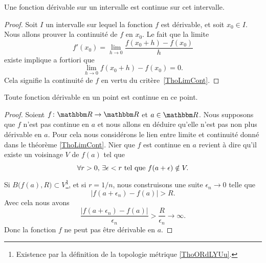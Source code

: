 \begin{proposition} \label{PropSFyxOWF}
    Une fonction dérivable sur un intervalle est continue sur cet intervalle.
\end{proposition}

\begin{proof}
    Soit \( I\) un intervalle sur lequel la fonction \( f\) est dérivable, et soit \( x_0\in I\). Nous allons prouver la continuité de \( f\) en \( x_0\). Le fait que la limite
    \begin{equation}
        f'(x_0)=\lim_{h\to 0} \frac{ f(x_0+h)-f(x_0) }{ h }
    \end{equation}
    existe implique a fortiori que
    \begin{equation}
        \lim_{h\to 0} f(x_0+h)-f(x_0)=0.
    \end{equation}
    Cela signifie la continuité de \( f\) en vertu du critère~\ref{ThoLimCont}.
\end{proof}

\begin{theorem} \label{THOooFFOZooCYGets}
  Toute fonction dérivable en un point est continue en ce point.
\end{theorem}

\begin{proof}
    Soient \( f\colon \eR\to \eR\) et \( a\in \eR\). Nous supposons que \( f\) n'est pas continue en \( a\) et nous allons en déduire qu'elle n'est pas non plus dérivable en \( a\). Pour cela nous considérons le lien entre limite et continuité donné dans le théorème \ref{ThoLimCont}. Nier que \( f\) est continue en \( a\) revient à dire qu'il existe un voisinage \( V\) de \( f(a)\) tel que
    \begin{equation}
        \forall r>0,\,\exists \epsilon<r \text{ tel que } f(a+\epsilon)\notin V.
    \end{equation}
    Si \( B\big( f(a),R \big)\subset V\)\footnote{Existence par la définition de la topologie métrique \ref{ThoORdLYUu}.}, et si \( r=1/n\), nous construisons une suite \( \epsilon_n\to 0\) telle que
    \begin{equation}
        | f(a+\epsilon_n)-f(a) |>R.
    \end{equation}
    Avec cela nous avons
    \begin{equation}
        \frac{ | f(a+\epsilon_n)-f(a) | }{ \epsilon_n }>\frac{ R }{ \epsilon_n }\to \infty.
    \end{equation}
    Donc la fonction \( f\) ne peut pas être dérivable en \( a\).
\end{proof}

